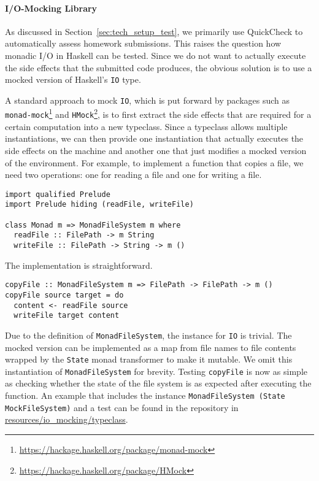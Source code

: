 \paragraph{I/O-Mocking Library}
As discussed in Section~\ref{sec:tech_setup_test}, we primarily use QuickCheck to automatically assess homework submissions.
This raises the question how monadic I/O in Haskell can be tested.
Since we do not want to actually execute the side effects that the submitted code produces,
the obvious solution is to use a mocked version of Haskell's \texttt{IO} type.

A standard approach to mock \texttt{IO}, which is put forward by packages such as \texttt{monad-mock}\footnote{\url{https://hackage.haskell.org/package/monad-mock}} and \texttt{HMock}\footnote{\url{https://hackage.haskell.org/package/HMock}}, is to first extract the side effects that are required for a certain computation into a new typeclass.
Since a typeclass allows multiple instantiations,
we can then provide one instantiation that actually executes the side effects on the machine
and another one that just modifies a mocked version of the environment.
For example, to implement a function that copies a file,
we need two operations:
one for reading a file and one for writing a file.
\begin{verbatim}
import qualified Prelude
import Prelude hiding (readFile, writeFile)

class Monad m => MonadFileSystem m where
  readFile :: FilePath -> m String
  writeFile :: FilePath -> String -> m ()
\end{verbatim}
The implementation is straightforward.
\begin{verbatim}
copyFile :: MonadFileSystem m => FilePath -> FilePath -> m ()
copyFile source target = do
  content <- readFile source
  writeFile target content
\end{verbatim}
Due to the definition of \texttt{MonadFileSystem}, the instance for \texttt{IO} is trivial.
The mocked version can be implemented as a map from file names to file contents wrapped by the \texttt{State} monad transformer to make it mutable.
We omit this instantiation of \texttt{MonadFileSystem} for brevity.
Testing \texttt{copyFile} is now as simple as checking whether the state of the file system is as expected after executing the function.
An example that includes the instance \texttt{MonadFileSystem (State MockFileSystem)} and a test can be found in the repository in \href{https://github.com/kappelmann/engaging-large-scale-functional-programming/tree/main/resources/io_mocking/typeclass}{resources/io\_mocking/typeclass}.
